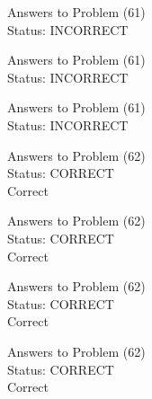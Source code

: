 \documentclass[11pt]{article}
\begin{document}
\begin{minipage}[t]{0.5\textwidth}
  {\centering
  
  Answers to Problem (61)\\
  Status: INCORRECT\\
  
  }
\end{minipage}
\begin{minipage}[t]{0.5\textwidth}
  {\centering
  
  Answers to Problem (61)\\
  Status: INCORRECT\\
  
  }
\end{minipage}
\begin{minipage}[t]{0.5\textwidth}
  {\centering
  
  Answers to Problem (61)\\
  Status: INCORRECT\\
  
  }
\end{minipage}
\begin{minipage}[t]{0.5\textwidth}
  {\centering
  
  Answers to Problem (62)\\
  Status: CORRECT\\
  Correct\\
  }
\end{minipage}
\begin{minipage}[t]{0.5\textwidth}
  {\centering
  
  Answers to Problem (62)\\
  Status: CORRECT\\
  Correct\\
  }
\end{minipage}
\begin{minipage}[t]{0.5\textwidth}
  {\centering
  
  Answers to Problem (62)\\
  Status: CORRECT\\
  Correct\\
  }
\end{minipage}
\begin{minipage}[t]{0.5\textwidth}
  {\centering
  
  Answers to Problem (62)\\
  Status: CORRECT\\
  Correct\\
  }
\end{minipage}
\end{document}
